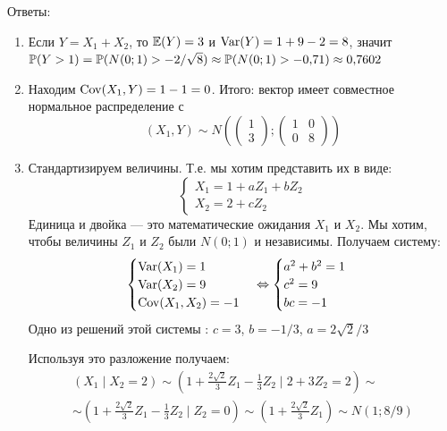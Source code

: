 \documentclass[12pt, a4paper]{article}\usepackage[]{graphicx}\usepackage[]{color}
\begin{document}
\begin{enumerate}
			Ответы:
			\begin{enumerate}
				\item Если $Y=X_1+X_2$, то $\E(Y)=3$ и $\Var(Y)=1+9-2=8$, значит $\P(Y>1)=\P(N(0;1)>-2/\sqrt{8})\approx \P(N(0;1)>-0{,}71)\approx 0{,}7602$
				\item Находим $\Cov(X_1,Y)=1-1=0$. Итого: вектор имеет совместное нормальное распределение с
				\begin{equation}
				(X_1,Y)\sim N\left(
				\left(\begin{array}{l}
				{1} \\
				{3}
				\end{array}\right);
				\left(\begin{array}{cc}
				{1} & {0} \\
				{0} & {8}
				\end{array}\right)
				\right)
				\end{equation}
				\item Стандартизируем величины. Т.е. мы хотим представить их в виде:
				\begin{equation}
				\begin{cases}
				X_1=1+aZ_1+bZ_2 \\
				X_2=2+cZ_2
				\end{cases}
				\end{equation}
				Единица и двойка — это математические ожидания $X_1$ и $X_2$. Мы хотим, чтобы величины $Z_1$ и $Z_2$ были $N(0;1)$ и независимы.
				Получаем систему:
				\begin{equation}
				\begin{cases}
				\Var(X_1)=1 \\
				\Var(X_2)=9 \\
				\Cov(X_1,X_2)=-1
				\end{cases} \Leftrightarrow
				\begin{cases}
				a^2+b^2=1 \\
				c^2=9 \\
				bc=-1
				\end{cases}
				\end{equation}
				Одно из решений этой системы : $c=3$, $b=-1/3$, $a=2\sqrt{2}/3$

				Используя это разложение получаем:
				\begin{multline}
				\left( X_1 \mid X_2=2\right) \sim \left( 1+\frac{2\sqrt{2}}{3}Z_1-\frac{1}{3}Z_2\mid 2+ 3Z_2=2\right)\sim \\
				\sim\left(1+\frac{2\sqrt{2}}{3}Z_1-\frac{1}{3}Z_2\mid Z_2=0\right)\sim \left(1+\frac{2\sqrt{2}}{3}Z_1\right)\sim N(1;8/9)
				\end{multline}


\end{enumerate}
\end{enumerate}
\end{document}
